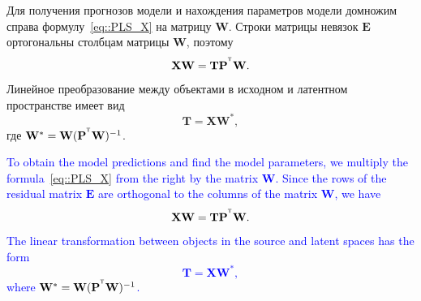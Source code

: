 \documentclass[12pt,twoside]{article}
\newcommand{\bX}{\mathbf{X}}
\newcommand{\bP}{\mathbf{P}}
\newcommand{\bT}{\mathbf{T}}
\newcommand{\bE}{\mathbf{E}}
\newcommand{\bW}{\mathbf{W}}
\newcommand{\T}{^{\text{\tiny\sffamily\upshape\mdseries T}}}
\begin{document}
Для получения прогнозов модели и нахождения параметров модели 
домножим справа формулу~\eqref{eq::PLS_X} на матрицу $\bW$. Строки матрицы невязок $\bE$ ортогональны столбцам матрицы $\bW$, поэтому 
\[
	\bX \bW = \bT \bP^{\T} \bW.
\] 
Линейное преобразование между объектами в исходном и латентном пространстве имеет вид
\begin{equation}
	\bT = \bX \bW^*,
	\label{eq::W*}
\end{equation}
где $\bW^* = \bW (\bP^{\T} \bW)^{-1}$. 

\textcolor{blue}{
To obtain the model predictions and find the model parameters, we multiply the formula~\eqref{eq::PLS_X} from the right by the matrix $\bW$. Since the rows of the residual matrix  $\bE$ are orthogonal to the columns of the matrix $\bW$, we have
\[
	\bX \bW = \bT \bP^{\T} \bW.
\]
The linear transformation between objects in the source and latent spaces has the form
\begin{equation}
	\bT = \bX \bW^*,
	\label{eq::W*}
\end{equation}
where $\bW^* = \bW (\bP^{\T} \bW)^{-1}$.}
\end{document}
